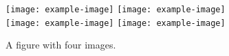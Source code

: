 \begin{figure}[thb] \centering
    \texttt{[image: example-image]}
    \texttt{[image: example-image]} 
    \\
    \texttt{[image: example-image]}
    \texttt{[image: example-image]} 
    \caption{A figure with four images.} \label{fig:figure3}
\end{figure}
